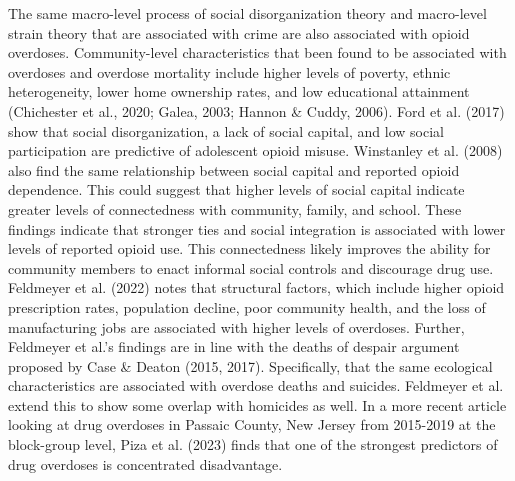 The same macro-level process of social disorganization theory and macro-level strain theory that are associated with crime are also associated with opioid overdoses. Community-level characteristics that been found to be associated with overdoses and overdose mortality include higher levels of poverty, ethnic heterogeneity, lower home ownership rates, and low educational attainment (Chichester et al., 2020; Galea, 2003; Hannon & Cuddy, 2006). Ford et al. (2017) show that social disorganization, a lack of social capital, and low social participation are predictive of adolescent opioid misuse. Winstanley et al. (2008) also find the same relationship between social capital and reported opioid dependence. This could suggest that higher levels of social capital indicate greater levels of connectedness with community, family, and school. These findings indicate that stronger ties and social integration is associated with lower levels of reported opioid use. This connectedness likely improves the ability for community members to enact informal social controls and discourage drug use. Feldmeyer et al. (2022) notes that structural factors, which include higher opioid prescription rates, population decline, poor community health, and the loss of manufacturing jobs are associated with higher levels of overdoses. Further, Feldmeyer et al.’s findings are in line with the deaths of despair argument proposed by Case & Deaton (2015, 2017). Specifically, that the same ecological characteristics are associated with overdose deaths and suicides. Feldmeyer et al. extend this to show some overlap with homicides as well. In a more recent article looking at drug overdoses in Passaic County, New Jersey from 2015-2019 at the block-group level, Piza et al. (2023) finds that one of the strongest predictors of drug overdoses is concentrated disadvantage. 

